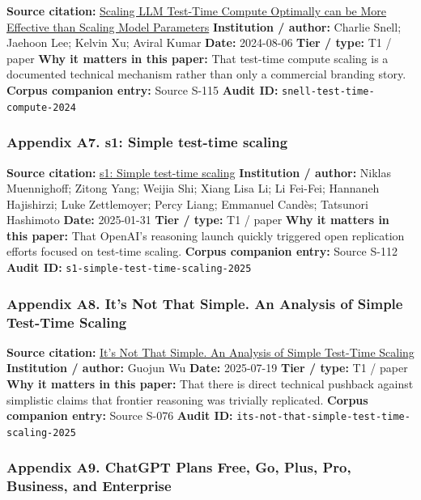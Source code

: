 \documentclass[
  american,
  11pt,
  letterpaper,
]{article}
\begin{document}
\textbf{Source citation:}
\href{https://arxiv.org/abs/2408.03314}{Scaling LLM Test-Time Compute
Optimally can be More Effective than Scaling Model Parameters}
\textbf{Institution / author:} Charlie Snell; Jaehoon Lee; Kelvin Xu;
Aviral Kumar \textbf{Date:} 2024-08-06 \textbf{Tier / type:} T1 / paper
\textbf{Why it matters in this paper:} That test-time compute scaling is
a documented technical mechanism rather than only a commercial branding
story. \textbf{Corpus companion entry:} Source S-115 \textbf{Audit ID:}
\texttt{snell-test-time-compute-2024}

\subsubsection{Appendix A7. s1: Simple test-time
scaling}\label{appendix-a7-s1-simple-test-time-scaling}

\textbf{Source citation:} \href{https://arxiv.org/abs/2501.19393}{s1:
Simple test-time scaling} \textbf{Institution / author:} Niklas
Muennighoff; Zitong Yang; Weijia Shi; Xiang Lisa Li; Li Fei-Fei;
Hannaneh Hajishirzi; Luke Zettlemoyer; Percy Liang; Emmanuel Candès;
Tatsunori Hashimoto \textbf{Date:} 2025-01-31 \textbf{Tier / type:} T1 /
paper \textbf{Why it matters in this paper:} That OpenAI's reasoning
launch quickly triggered open replication efforts focused on test-time
scaling. \textbf{Corpus companion entry:} Source S-112 \textbf{Audit
ID:} \texttt{s1-simple-test-time-scaling-2025}

\subsubsection{Appendix A8. It's Not That Simple. An Analysis of Simple
Test-Time
Scaling}\label{appendix-a8-it-s-not-that-simple-an-analysis-of-simple-test-time-scaling}

\textbf{Source citation:} \href{https://arxiv.org/abs/2507.14419}{It's
Not That Simple. An Analysis of Simple Test-Time Scaling}
\textbf{Institution / author:} Guojun Wu \textbf{Date:} 2025-07-19
\textbf{Tier / type:} T1 / paper \textbf{Why it matters in this paper:}
That there is direct technical pushback against simplistic claims that
frontier reasoning was trivially replicated. \textbf{Corpus companion
entry:} Source S-076 \textbf{Audit ID:}
\texttt{its-not-that-simple-test-time-scaling-2025}

\subsubsection{Appendix A9. ChatGPT Plans \textbar{} Free, Go, Plus,
Pro, Business, and
Enterprise}\label{appendix-a9-chatgpt-plans-free-go-plus-pro-business-and-enterprise}
\end{document}
